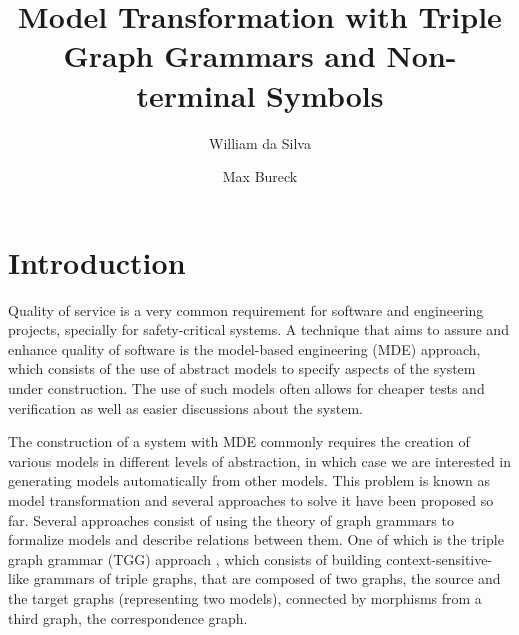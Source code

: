 \documentclass[runningheads]{llncs}
\begin{document}
%
\title{Model Transformation with Triple Graph Grammars and Non-terminal Symbols}
%
%
\author{William {da Silva} \and
Max {Bureck}}
%
%
%
\maketitle              %
%
\begin{abstract}

\end{abstract}
%
%
%
\section{Introduction}
Quality of service is a very common requirement for software and engineering projects, specially for safety-critical systems. A technique that aims to assure and enhance quality of software is the model-based engineering (MDE) approach, which consists of the use of abstract models to specify aspects of the system under construction. The use of such models often allows for cheaper tests and verification as well as easier discussions about the system. 

The construction of a system with MDE commonly requires the creation of various models in different levels of abstraction, in which case we are interested in generating models automatically from other models. This problem is known as model transformation and several approaches to solve it have been proposed so far. Several approaches consist of using the theory of graph grammars to formalize models and describe relations between them. One of which is the triple graph grammar (TGG) approach \cite{schurr1994specification}, which consists of building context-sensitive-like grammars of triple graphs, that are composed of two graphs, the source and the target graphs (representing two models), connected by morphisms from a third graph, the correspondence graph.
\end{document}
